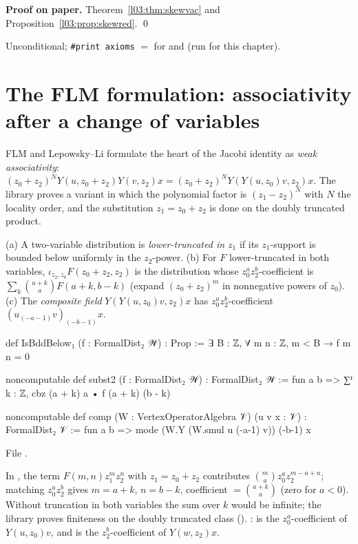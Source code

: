 \textbf{Proof on paper.} Theorem~\ref{l03:thm:skewvac} and Proposition~\ref{l03:prop:skewred}. \qed

\begin{status}
Unconditional; \texttt{\#print axioms} $=$  for
 and  (run for this chapter).
\end{status}

\section[The FLM formulation]{The FLM formulation: associativity after a change of variables}\label{l03:sec:flm}

FLM and Lepowsky--Li formulate the heart of the Jacobi identity as \emph{weak associativity}:
$(z_0+z_2)^NY(u,z_0+z_2)Y(v,z_2)x = (z_0+z_2)^NY(Y(u,z_0)v,z_2)x$. The library proves a variant in
which the polynomial factor is $(z_1-z_2)^N$ with $N$ the locality order, and the substitution
$z_1 = z_0+z_2$ is done on the doubly truncated product.

\begin{definition}\label{l03:def:subst2}
(a) A two-variable distribution is \emph{lower-truncated in $z_1$} if its $z_1$-support is bounded
below uniformly in the $z_2$-power. (b) For $F$ lower-truncated in both variables,
$\iota_{z_2,z_0}F(z_0+z_2,z_2)$ is the distribution whose $z_0^az_2^b$-coefficient is
$\sum_{k}\binom{a+k}{a}F(a+k,b-k)$ (expand $(z_0+z_2)^{m}$ in nonnegative powers of $z_0$). (c) The
\emph{composite field} $Y(Y(u,z_0)v,z_2)x$ has $z_0^az_2^b$-coefficient $(u_{(-a-1)}v)_{(-b-1)}x$.
\end{definition}
\begin{leancode}
def IsBddBelow₁ (f : FormalDist₂ 𝒲) : Prop := ∃ B : ℤ, ∀ m n : ℤ, m < B → f m n = 0

noncomputable def subst2 (f : FormalDist₂ 𝒲) : FormalDist₂ 𝒲 :=
  fun a b => ∑ᶠ k : ℤ, cbz (a + k) a • f (a + k) (b - k)

noncomputable def comp (W : VertexOperatorAlgebra 𝒱) (u v x : 𝒱) : FormalDist₂ 𝒱 :=
  fun a b => mode (W.Y (W.smul u (-a-1) v)) (-b-1) x
\end{leancode}
File .

\begin{dictionary}
In , the term $F(m,n)z_1^mz_2^n$ with $z_1 = z_0+z_2$ contributes
$\binom ma z_0^az_2^{m-a+n}$; matching $z_0^az_2^b$ gives $m = a+k$, $n = b-k$, coefficient
 $=\binom{a+k}a$ (zero for $a<0$). Without truncation in both variables the sum
over $k$ would be infinite; the library proves finiteness on the doubly truncated class
(). :  is the $z_0^a$-coefficient of
$Y(u,z_0)v$, and  is the $z_2^b$-coefficient of $Y(w,z_2)x$.
\end{dictionary}

